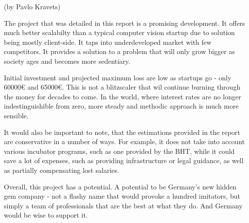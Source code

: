 (by Pavlo Kravets)

\p
The project that was detailed in this report is a promising development. It offers much better scalabilty than a typical computer vision startup due to solution being mostly client-side. It taps into underdeveloped market with few competitors. It provides a solution to a problem that will only grow bigger as society ages and becomes more sedentiary.

\p
Initial investment and projected maximum loss are low as startups go - only 60000€ and 65000€. This is not a blitzscaler that wil continue burning through the money for decades to come. In the world, where interest rates are no longer indestinguishible from zero, more steady and methodic approach is much more sensible.

\p
It would also be important to note, that the estimations provided in the report are conservative in a number of ways. For example, it does not take into account various incubator programs, such as one provided by the BHT, while it could save a lot of expenses, such as providing infrastructure or legal guidance, as well as partially compensating lost salaries. 

\p
Overall, this project has a potential. A potential to be Germany's new hidden gem company - not a flashy name that would provoke a hundred imitators, but simply a team of professionals that are the best at what they do. And Germany would be wise to support it.